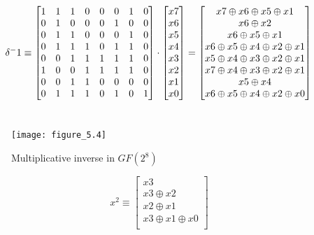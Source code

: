 \begin{equation}
\delta ^-1 \equiv 
\begin{bmatrix}
1  & 1  & 1  & 0  & 0  & 0  & 1  & 0 \\
0  & 1  & 0  & 0  & 0  & 1  & 0  & 0 \\
0  & 1  & 1  & 0  & 0  & 0  & 1  & 0 \\
0  & 1  & 1  & 1  & 0  & 1  & 1  & 0 \\
0  & 0  & 1  & 1  & 1  & 1  & 1  & 0 \\
1  & 0  & 0  & 1  & 1  & 1  & 1  & 0 \\
0  & 0  & 1  & 1  & 0  & 0  & 0  & 0 \\
0  & 1  & 1  & 1  & 0  & 1  & 0  & 1 \\
\end{bmatrix}
\cdot
\begin{bmatrix}
x7 \\ x6 \\ x5 \\ x4 \\ x3 \\ x2 \\ x1 \\ x0 \\ 
\end{bmatrix}
=
\begin{bmatrix}
x7\oplus x6\oplus x5\oplus x1  \\
x6\oplus x2 \\
x6\oplus x5\oplus x1  \\
x6\oplus x5\oplus x4\oplus x2\oplus x1  \\
x5\oplus x4\oplus x3\oplus x2\oplus x1  \\
x7\oplus x4\oplus x3\oplus x2\oplus x1  \\
x5\oplus x4 \\
x6\oplus x5\oplus x4\oplus x2\oplus x0  \\
\end{bmatrix}\\
\end{equation}\\

\begin{figure}
\centering
\texttt{[image: figure\_5.4]}\\
\caption{ Multiplicative inverse in $GF(2^8)$ }
\label{fig:figure_5.4}
\end{figure}

\begin{equation}
x^2 \equiv
\begin{bmatrix}
x3 \\
x3\oplus x2 \\
x2\oplus x1 \\
x3\oplus x1\oplus x0 \\
\end{bmatrix}
\end{equation}

